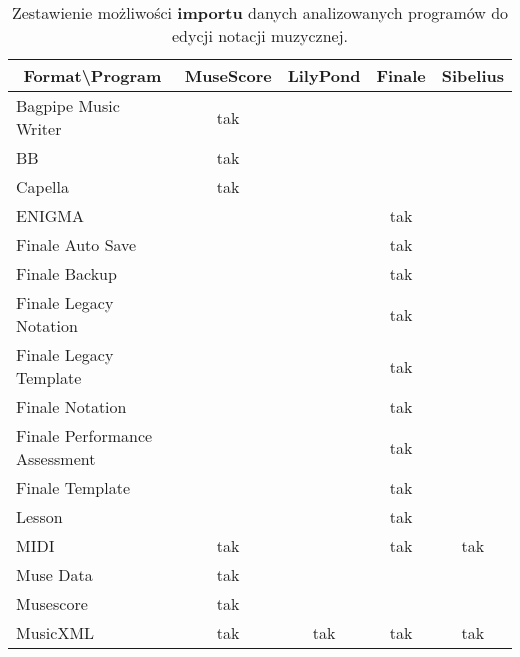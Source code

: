 \begin{center}
\begin{longtable}{|l|c|c|c|c|}
\caption{Zestawienie możliwości \textbf{importu} danych analizowanych programów do edycji notacji muzycznej.} \label{edytory-import} \\
\hline
\multicolumn{1}{|c|}{\textbf{Format{\textbackslash}Program}} & MuseScore & LilyPond & Finale & Sibelius \\ \hline
Bagpipe Music Writer                          & tak       &          &        &          \\ \hline
BB                                            & tak       &          &        &          \\ \hline
Capella                                       & tak       &          &        &          \\ \hline
ENIGMA                                        &           &          & tak    &          \\ \hline
Finale Auto Save                              &           &          & tak    &          \\ \hline
Finale Backup                                 &           &          & tak    &          \\ \hline
Finale Legacy Notation                        &           &          & tak    &          \\ \hline
Finale Legacy Template                        &           &          & tak    &          \\ \hline
Finale Notation                               &           &          & tak    &          \\ \hline
Finale Performance Assessment                 &           &          & tak    &          \\ \hline
Finale Template                               &           &          & tak    &          \\ \hline
Lesson                                        &           &          & tak    &          \\ \hline
MIDI                                          & tak       &          & tak    & tak      \\ \hline
Muse Data                                     & tak       &          &        &          \\ \hline
Musescore                                     & tak       &          &        &          \\ \hline
MusicXML                                      & tak       & tak      & tak    & tak      \\ \hline

\end{longtable}
\end{center}
